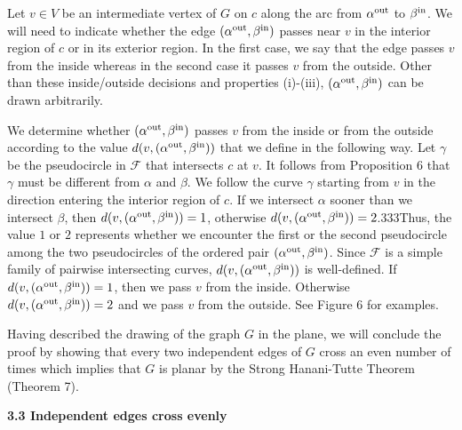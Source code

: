 \documentclass[10pt,a4paper]{amsart}
\providecommand{\cal}{\mathcal}
\begin{document}
\par
\par
Let $v\in V$ be an intermediate vertex of $G$ on $c$ along the arc from $\alpha^{\rm out}$ to $\beta^{\rm in}$. We will need to indicate whether the edge $(\alpha^{\rm out},\beta^{\rm in})$ passes near $v$ in the interior region of $c$ or in its exterior region. In the first case, we say that the edge passes $v$ from the inside whereas in the second case it passes $v$ from the outside. Other than these inside/outside decisions and properties (i)-(iii), $(\alpha^{\rm out},\beta^{\rm in})$ can be drawn arbitrarily.
\par
\par
We determine whether $(\alpha^{\rm out},\beta^{\rm in})$ passes $v$ from the inside or from the outside according to the value $d(v,(\alpha^{\rm out},\beta^{\rm in}))$ that we define in the following way. Let $\gamma$ be the pseudocircle in ${\cal{F}}$ that intersects $c$ at $v$. It follows from Proposition 6 that $\gamma$ must be different from $\alpha$ and $\beta$. We follow the curve $\gamma$ starting from $v$ in the direction entering the interior region of $c$. If we intersect $\alpha$ sooner than we intersect $\beta$, then $d(v,(\alpha^{\rm out},\beta^{\rm in}))=1$, otherwise $d(v,(\alpha^{\rm out},\beta^{\rm in}))=2$.333Thus, the value $1$ or $2$ represents whether we encounter the first or the second pseudocircle among the two pseudocircles of the ordered pair $(\alpha^{\rm out},\beta^{\rm in})$. Since ${\cal{F}}$ is a simple family of pairwise intersecting curves, $d(v,(\alpha^{\rm out},\beta^{\rm in}))$ is well-defined. If $d(v,(\alpha^{\rm out},\beta^{\rm in}))=1$, then we pass $v$ from the inside. Otherwise $d(v,(\alpha^{\rm out},\beta^{\rm in}))=2$ and we pass $v$ from the outside. See Figure 6 for examples.
\par
\par
Having described the drawing of the graph $G$ in the plane, we will conclude the proof by showing that every two independent edges of $G$ cross an even number of times which implies that $G$ is planar by the Strong Hanani-Tutte Theorem (Theorem 7).
\par
\par
\par
\par\medskip\noindent\textbf{3.3 Independent edges cross evenly}\par
\end{document}
